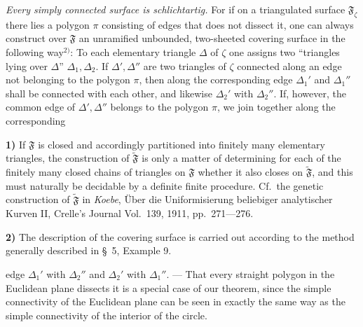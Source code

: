 \documentclass{article}
\begin{document}
\emph{Every simply connected surface is schlichtartig.} For if on a triangulated surface $\mathfrak{F}_\zeta$ there lies a polygon $\pi$ consisting of edges that does not dissect it, one can always construct over $\mathfrak{F}$ an unramified unbounded, two-sheeted covering surface in the following way${}^{2)}$: To each elementary triangle $\Delta$ of $\zeta$ one assigns two ``triangles lying over $\Delta$'' $\Delta_1, \Delta_2$. If $\Delta', \Delta''$ are two triangles of $\zeta$ connected along an edge not belonging to the polygon $\pi$, then along the corresponding edge $\Delta_1'$ and $\Delta_1''$ shall be connected with each other, and likewise $\Delta_2'$ with $\Delta_2''$. If, however, the common edge of $\Delta', \Delta''$ belongs to the polygon $\pi$, we join together along the corresponding

\textbf{1)} If $\mathfrak{F}$ is closed and accordingly partitioned into finitely many elementary triangles, the construction of $\tilde{\mathfrak{F}}$ is only a matter of determining for each of the finitely many closed chains of triangles on $\mathfrak{F}$ whether it also closes on $\tilde{\mathfrak{F}}$, and this must naturally be decidable by a definite finite procedure. Cf.\ the genetic construction of $\tilde{\mathfrak{F}}$ in \emph{Koebe}, Über die Uniformisierung beliebiger analytischer Kurven II, Crelle's Journal Vol.\ 139, 1911, pp.\ 271---276.

\textbf{2)} The description of the covering surface is carried out according to the method generally described in §~5, Example 9.

edge $\Delta_1'$ with $\Delta_2''$ and $\Delta_2'$ with $\Delta_1''$. --- That every straight polygon in the Euclidean plane dissects it is a special case of our theorem, since the simple connectivity of the Euclidean plane can be seen in exactly the same way as the simple connectivity of the interior of the circle.
\end{document}
